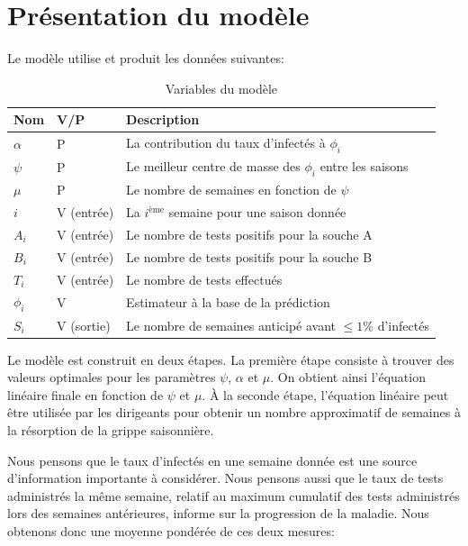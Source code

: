 \documentclass[12pt]{article}
\begin{document}
\section{Pr\'esentation du mod\`ele}
Le mod\`ele utilise et produit les donn\'ees suivantes:
\begin{table}[h]
    \centering
    \caption{Variables du mod\`ele}
    \begin{tabular}{|l|l|l|}\hline
        Nom &V/P &Description\\\hline
        $\alpha$ &P &La contribution du taux d'infect\'es \`a $\phi_i$\\\hline
        $\psi$ &P &Le meilleur centre de masse des $\phi_i$ entre les saisons\\\hline
        $\mu$ &P &Le nombre de semaines en fonction de $\psi$\\\hline
        $i$ &V (entr\'ee) &La $i^{\text{\`eme}}$ semaine pour une saison donn\'ee\\\hline
        $A_i$ &V (entr\'ee) &Le nombre de tests positifs pour la souche A\\\hline
        $B_i$ &V (entr\'ee) &Le nombre de tests positifs pour la souche B\\\hline
        $T_i$ &V (entr\'ee) &Le nombre de tests effectu\'es\\\hline
        $\phi_i$ &V &Estimateur \`a la base de la pr\'ediction\\\hline
        $S_i$ &V (sortie) &Le nombre de semaines anticip\'e avant $\leq 1\%$ d'infect\'es\\\hline
    \end{tabular}
\end{table}

Le mod\`ele est construit en deux \'etapes. La premi\`ere \'etape consiste \`a trouver des valeurs
optimales pour les param\`etres $\psi$, $\alpha$ et $\mu$.  On obtient ainsi l'\'equation lin\'eaire
finale en fonction de $\psi$ et $\mu$. \`A la seconde \'etape, l'\'equation lin\'eaire peut \^etre
utilis\'ee par les dirigeants pour obtenir un nombre approximatif de semaines \`a la r\'esorption de
la grippe saisonni\`ere.

Nous pensons que le taux d'infect\'es en une semaine donn\'ee est une source d'information
importante \`a consid\'erer. Nous pensons aussi que le taux de tests administr\'es la m\^eme
semaine, relatif au maximum cumulatif des tests administr\'es lors des semaines ant\'erieures,
informe sur la progression de la maladie.  Nous obtenons donc une moyenne pond\'er\'ee de ces deux
mesures:
\end{document}
